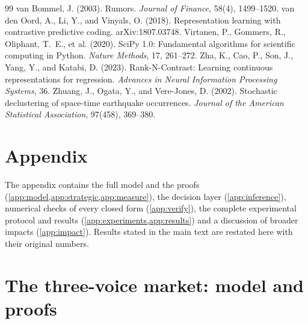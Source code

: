 \documentclass{article}
\theoremstyle{plain}
\theoremstyle{definition}
\theoremstyle{remark}
\begin{document}
{\begin{thebibliography}{99}
 van Bommel, J. (2003). Rumors. \emph{Journal of Finance}, 58(4), 1499--1520.
 van den Oord, A., Li, Y., and Vinyals, O. (2018). Representation learning with contrastive predictive coding. arXiv:1807.03748.
 Virtanen, P., Gommers, R., Oliphant, T.~E., et al. (2020). SciPy 1.0: Fundamental algorithms for scientific computing in Python. \emph{Nature Methods}, 17, 261--272.
 Zha, K., Cao, P., Son, J., Yang, Y., and Katabi, D. (2023). Rank-N-Contrast: Learning continuous representations for regression. \emph{Advances in Neural Information Processing Systems}, 36.
 Zhuang, J., Ogata, Y., and Vere-Jones, D. (2002). Stochastic declustering of space-time earthquake occurrences. \emph{Journal of the American Statistical Association}, 97(458), 369--380.
\end{thebibliography}
}

\newpage
\appendix
\section*{Appendix}

The appendix contains the full model and the proofs (\cref{app:model,app:strategic,app:measure}), the decision layer (\cref{app:inference}), numerical checks of every closed form (\cref{app:verify}), the complete experimental protocol and results (\cref{app:experiments,app:results}) and a discussion of broader impacts (\cref{app:impact}). Results stated in the main text are restated here with their original numbers.

\section{The three-voice market: model and proofs}\label{app:model}
\end{document}
